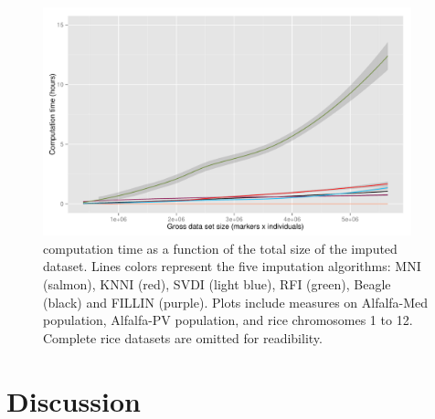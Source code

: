 \begin{figure}
\includegraphics[width=0.95\textwidth]{time_vs_size.pdf}
\caption[Computation times]{computation time as a function of the total size of the imputed dataset.
Lines colors represent the five imputation algorithms: MNI (salmon), KNNI (red), SVDI (light blue), RFI (green), Beagle (black) and FILLIN (purple).
Plots include measures on Alfalfa-Med population, Alfalfa-PV population, and rice chromosomes 1 to 12. Complete rice datasets are omitted for readibility.}
\label{fig:time_analysis}
\end{figure}
 
\makeatletter{}\section{Discussion}
\label{sec:discussion}

